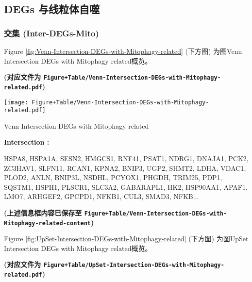 \documentclass[
]{article}
\begin{document}
\hypertarget{degs-ux4e0eux7ebfux7c92ux4f53ux81eaux566c}{%
\subsection{DEGs 与线粒体自噬}\label{degs-ux4e0eux7ebfux7c92ux4f53ux81eaux566c}}

\hypertarget{ux4ea4ux96c6-inter-degs-mito}{%
\subsubsection{交集 (Inter-DEGs-Mito)}\label{ux4ea4ux96c6-inter-degs-mito}}

Figure \ref{fig:Venn-Intersection-DEGs-with-Mitophagy-related} (下方图) 为图Venn Intersection DEGs with Mitophagy related概览。

\textbf{(对应文件为 \texttt{Figure+Table/Venn-Intersection-DEGs-with-Mitophagy-related.pdf})}

\def\@captype{figure}
\begin{center}
\texttt{[image: Figure+Table/Venn-Intersection-DEGs-with-Mitophagy-related.pdf]}
\caption{Venn Intersection DEGs with Mitophagy related}\label{fig:Venn-Intersection-DEGs-with-Mitophagy-related}
\end{center}
\begin{center}\begin{tcolorbox}[colback=gray!10, colframe=gray!50, width=0.9\linewidth, arc=1mm, boxrule=0.5pt]
\textbf{
Intersection
:}

\vspace{0.5em}

    HSPA8, HSPA1A, SESN2, HMGCS1, RNF41, PSAT1, NDRG1,
DNAJA1, PCK2, ZC3HAV1, SLFN11, RCAN1, KPNA2, BNIP3, UGP2,
SHMT2, LDHA, VDAC1, PLOD2, ANLN, BNIP3L, NSDHL, PCYOX1,
PHGDH, TRIM25, PDP1, SQSTM1, HSPH1, PLSCR1, SLC3A2,
GABARAPL1, HK2, HSP90AA1, APAF1, LMO7, ARHGEF2, GPCPD1,
NFKB1, CUL3, SMAD3, NFKB...

\vspace{2em}
\end{tcolorbox}
\end{center}

\textbf{(上述信息框内容已保存至 \texttt{Figure+Table/Venn-Intersection-DEGs-with-Mitophagy-related-content})}

Figure \ref{fig:UpSet-Intersection-DEGs-with-Mitophagy-related} (下方图) 为图UpSet Intersection DEGs with Mitophagy related概览。

\textbf{(对应文件为 \texttt{Figure+Table/UpSet-Intersection-DEGs-with-Mitophagy-related.pdf})}
\end{document}
